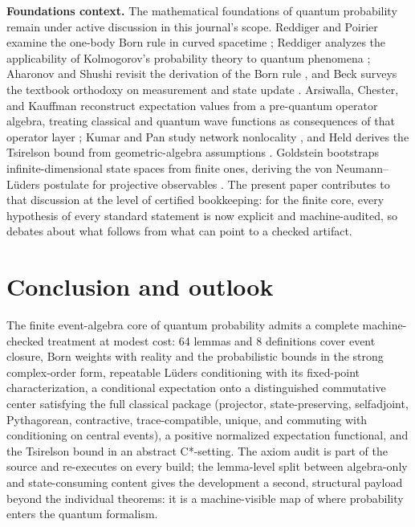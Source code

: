 \documentclass[11pt]{article}
\renewcommand{\_}{\textunderscore\allowbreak}
\theoremstyle{remark}
\begin{document}
\textbf{Foundations context.} The mathematical foundations of quantum probability remain under active discussion in this journal's scope. Reddiger and Poirier examine the one-body Born rule in curved spacetime \cite{reddigerpoirier2025}; Reddiger analyzes the applicability of Kolmogorov's probability theory to quantum phenomena \cite{reddiger2026}; Aharonov and Shushi revisit the derivation of the Born rule \cite{aharonovshushi2024}, and Beck surveys the textbook orthodoxy on measurement and state update \cite{beck2026}. Arsiwalla, Chester, and Kauffman reconstruct expectation values from a pre-quantum operator algebra, treating classical and quantum wave functions as consequences of that operator layer \cite{arsiwalla2024}; Kumar and Pan study network nonlocality \cite{kumarpan2023}, and Held derives the Tsirelson bound from geometric-algebra assumptions \cite{held2021}. Goldstein bootstraps infinite-dimensional state spaces from finite ones, deriving the von Neumann--L\"uders postulate for projective observables \cite{goldstein2026}. The present paper contributes to that discussion at the level of certified bookkeeping: for the finite core, every hypothesis of every standard statement is now explicit and machine-audited, so debates about what follows from what can point to a checked artifact.

\section{Conclusion and outlook}
\label{sec:conclusion}

The finite event-algebra core of quantum probability admits a complete machine-checked treatment at modest cost: 64 lemmas and 8 definitions cover event closure, Born weights with reality and the probabilistic bounds in the strong complex-order form, repeatable L\"uders conditioning with its fixed-point characterization, a conditional expectation onto a distinguished commutative center satisfying the full classical package (projector, state-preserving, selfadjoint, Pythagorean, contractive, trace-compatible, unique, and commuting with conditioning on central events), a positive normalized expectation functional, and the Tsirelson bound in an abstract C*-setting. The axiom audit is part of the source and re-executes on every build; the lemma-level split between algebra-only and state-consuming content gives the development a second, structural payload beyond the individual theorems: it is a machine-visible map of where probability enters the quantum formalism.
\end{document}
